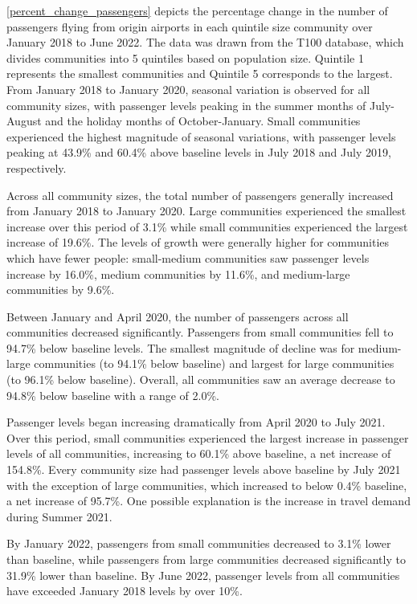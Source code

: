 \documentclass[11pt]{article}
\begin{document}
\cref{percent_change_passengers} depicts the percentage change in the number of passengers flying from origin airports in each quintile size community over January 2018 to June 2022. The data was drawn from the T100 database, which divides communities into 5 quintiles based on population size. Quintile 1 represents the smallest communities and Quintile 5 corresponds to the largest. From January 2018 to January 2020, seasonal variation is observed for all community sizes, with passenger levels peaking in the summer months of July-August and the holiday months of October-January. Small communities experienced the highest magnitude of seasonal variations, with passenger levels peaking at 43.9\% and 60.4\% above baseline levels in July 2018 and July 2019, respectively.

\-\hspace{0.5cm} Across all community sizes, the total number of passengers generally increased from January 2018 to January 2020. Large communities experienced the smallest increase over this period of 3.1\% while small communities experienced the largest increase of 19.6\%. The levels of growth were generally higher for communities which have fewer people: small-medium communities saw passenger levels increase by 16.0\%, medium communities by 11.6\%, and medium-large communities by 9.6\%. 

\-\hspace{0.5cm} Between January and April 2020, the number of passengers across all communities decreased significantly. Passengers from small communities fell to 94.7\% below baseline levels. The smallest magnitude of decline was for medium-large communities (to 94.1\% below baseline) and largest for large communities (to 96.1\% below baseline). Overall, all communities saw an average decrease to 94.8\% below baseline with a range of 2.0\%.

\-\hspace{0.5cm} Passenger levels began increasing dramatically from April 2020 to July 2021. Over this period, small communities experienced the largest increase in passenger levels of all communities, increasing to 60.1\% above baseline, a net increase of 154.8\%. Every community size had passenger levels above baseline by July 2021 with the exception of large communities, which increased to below 0.4\% baseline, a net increase of 95.7\%. One possible explanation is the increase in travel demand during Summer 2021.

\-\hspace{0.5cm} By January 2022, passengers from small communities decreased to 3.1\% lower than baseline, while passengers from large communities decreased significantly to 31.9\% lower than baseline. By June 2022, passenger levels from all communities have exceeded January 2018 levels by over 10\%.
\end{document}
